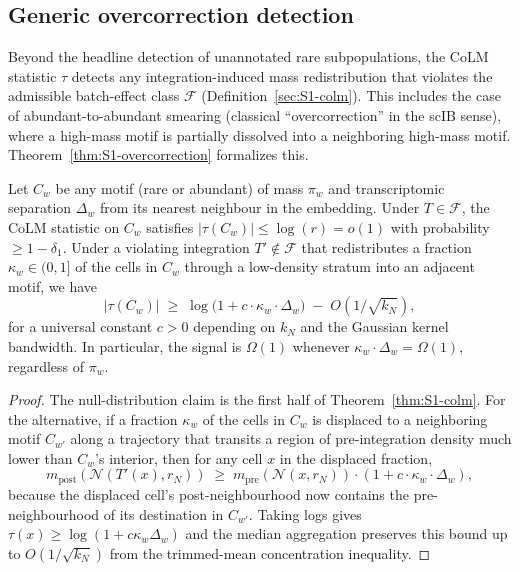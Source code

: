 
\subsection{Generic overcorrection detection}
\label{sec:S1-overcorrection}

Beyond the headline detection of unannotated rare subpopulations, the CoLM statistic $\tau$ detects any integration-induced mass redistribution that violates the admissible batch-effect class $\mathcal{F}$ (Definition~\ref{sec:S1-colm}). This includes the case of abundant-to-abundant smearing (classical ``overcorrection'' in the scIB sense), where a high-mass motif is partially dissolved into a neighboring high-mass motif. Theorem~\ref{thm:S1-overcorrection} formalizes this.

\begin{theorem}
\label{thm:S1-overcorrection}
Let $C_{w}$ be any motif (rare or abundant) of mass $\pi_{w}$ and transcriptomic separation $\Delta_{w}$ from its nearest neighbour in the embedding. Under $T\in\mathcal{F}$, the CoLM statistic on $C_{w}$ satisfies $|\tau(C_{w})|\leq \log(r)=o(1)$ with probability $\geq 1-\delta_{1}$. Under a violating integration $T'\notin\mathcal{F}$ that redistributes a fraction $\kappa_{w}\in(0,1]$ of the cells in $C_{w}$ through a low-density stratum into an adjacent motif, we have
\[
  |\tau(C_{w})| \;\geq\; \log\!\bigl(1 + c\cdot\kappa_{w}\cdot \Delta_{w}\bigr) \;-\; O(1/\sqrt{k_{N}}),
\]
for a universal constant $c>0$ depending on $k_{N}$ and the Gaussian kernel bandwidth. In particular, the signal is $\Omega(1)$ whenever $\kappa_{w}\cdot\Delta_{w}=\Omega(1)$, regardless of $\pi_{w}$.
\end{theorem}

\begin{proof}
The null-distribution claim is the first half of Theorem~\ref{thm:S1-colm}. For the alternative, if a fraction $\kappa_{w}$ of the cells in $C_{w}$ is displaced to a neighboring motif $C_{w'}$ along a trajectory that transits a region of pre-integration density much lower than $C_{w}$'s interior, then for any cell $x$ in the displaced fraction,
\[
  m_{\mathrm{post}}(\mathcal{N}(T'(x), r_{N})) \;\geq\; m_{\mathrm{pre}}(\mathcal{N}(x, r_{N})) \cdot (1 + c\cdot\kappa_{w}\cdot\Delta_{w}),
\]
because the displaced cell's post-neighbourhood now contains the pre-neighbourhood of its destination in $C_{w'}$. Taking logs gives $\tau(x)\geq \log(1+c\kappa_{w}\Delta_{w})$ and the median aggregation preserves this bound up to $O(1/\sqrt{k_{N}})$ from the trimmed-mean concentration inequality.
\end{proof}

